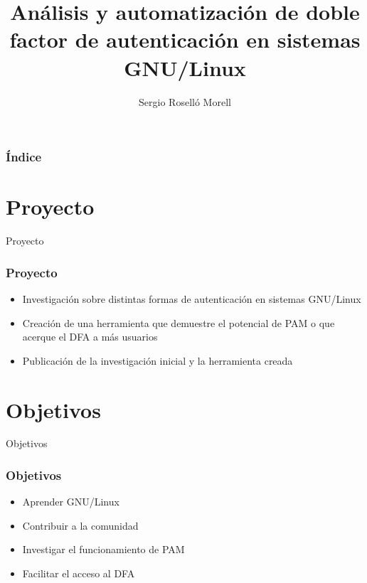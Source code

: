 \documentclass{beamer}
\title{Análisis y automatización de doble factor de autenticación en sistemas GNU/Linux}
\author{Sergio Roselló Morell}
\date{}
\begin{document}
\beamertemplatenavigationsymbolsempty

\frame{\titlepage}

\begin{frame}
\frametitle{Índice}
\tableofcontents
\end{frame}
\section{Proyecto}
\begin{frame}{Proyecto}
	\frametitle{Proyecto}
	\begin{itemize}
		\item Investigación sobre distintas formas de autenticación en sistemas GNU/Linux
		\vspace{0.7cm}
		\item Creación de una herramienta que demuestre el potencial de PAM o que acerque el DFA a más usuarios
		\vspace{0.7cm}
		\item Publicación de la investigación inicial y la herramienta creada
	\end{itemize}
\end{frame}
\section{Objetivos}
\begin{frame}{Objetivos}
	\frametitle{Objetivos}
	{
	\begin{itemize}
		\item Aprender GNU/Linux
		\item Contribuir a la comunidad
		\item Investigar el funcionamiento de PAM
		\item Facilitar el acceso al DFA
	\end{itemize}
	\\}
\end{frame}
\end{document}

